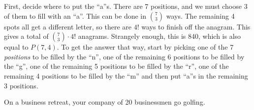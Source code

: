 \begin{questions}
	\begin{answer}
		First, decide where to put the ``a''s.  There are 7 positions, and we must choose 3 of them to fill with an ``a''.  This can be done in ${7 \choose 3}$ ways.  The remaining 4 spots all get a different letter, so there are $4!$ ways to finish off the anagram.  This gives a total of ${7 \choose 3}\cdot 4!$ anagrams.  Strangely enough, this is 840, which is also equal to $P(7,4)$.  To get the answer that way, start by picking one of the 7 \emph{positions} to be filled by the ``n'', one of the remaining 6 positions to be filled by the ``g'', one of the remaining 5 positions to be filled by the ``r'', one of the remaining 4 positions to be filled by the ``m'' and then put ``a''s in the remaining 3 positions.
	\end{answer}
	
	

\question On a business retreat, your company of 20 businessmen go golfing.

  \begin{answer}
  \end{answer}




\end{questions}
